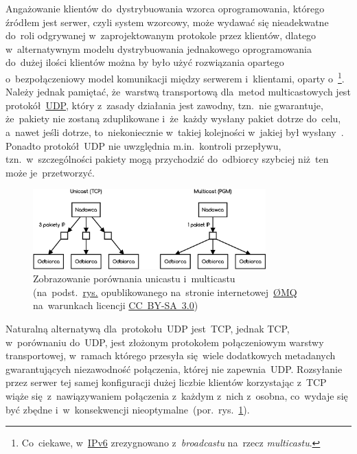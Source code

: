 \documentclass[thesis]{subfiles}
\begin{document}
Angażowanie klientów do~dystrybuowania wzorca oprogramowania, którego źródłem jest serwer, czyli system wzorcowy, może wydawać się nieadekwatne do~roli odgrywanej w~zaprojektowanym protokole przez klientów, dlatego w~alternatywnym modelu dystrybuowania jednakowego oprogramowania do~dużej ilości klientów można by było użyć rozwiązania opartego o~bezpołączeniowy model komunikacji między serwerem i~klientami, oparty o~\footnote{Co~ciekawe, w~\href{https://en.wikipedia.org/wiki/IPv6}{IPv6} zrezygnowano z~\emph{broadcastu} na~rzecz \emph{multicastu}.}. Należy jednak pamiętać, że~warstwą transportową dla~metod multicastowych jest protokół~\href{https://en.wikipedia.org/wiki/User_Datagram_Protocol}{UDP}, który z~zasady działania jest zawodny, tzn.~nie gwarantuje, że~pakiety nie zostaną zduplikowane i~że~każdy wysłany pakiet dotrze do~celu, a~nawet jeśli dotrze, to~niekoniecznie w~takiej kolejności w~jakiej był wysłany~\cite{rfc1112}. Ponadto protokół~UDP nie uwzględnia m.in.~kontroli przepływu, tzn.~w~szczególności pakiety mogą przychodzić do~odbiorcy szybciej niż~ten może je~przetworzyć.

\begin{figure}[h]
	\centering
	\includegraphics[width=0.8\textwidth]{img/unicast-vs-multicast}
	\caption[Zobrazowanie porównania unicastu i~multicastu]{Zobrazowanie porównania unicastu i~multicastu\\(na~podst.~\href{http://zeromq.wdfiles.com/local--files/whitepapers\%3Adesign-v05/pgm2.png}{rys.} opublikowanego na~stronie internetowej~\href{http://zeromq.org/}{ØMQ} na~warunkach licencji \emph{} \href{https://creativecommons.org/licenses/by-sa/3.0/}{CC~BY-SA~3.0})}
	\label{fig:unicast-vs-multicast}
\end{figure}

Naturalną alternatywą dla~protokołu~UDP jest~TCP, jednak TCP, w~porównaniu do~UDP, jest złożonym protokołem połączeniowym warstwy transportowej, w~ramach którego przesyła się~wiele dodatkowych metadanych gwarantujących niezawodność połączenia, której nie zapewnia~UDP. Rozsyłanie przez serwer tej samej konfiguracji dużej liczbie klientów korzystając z~TCP wiąże się~z~nawiązywaniem połączenia z~każdym z~nich z~osobna, co~wydaje się być zbędne i~w~konsekwencji nieoptymalne~(por.~rys.~\ref{fig:unicast-vs-multicast}).
\end{document}
